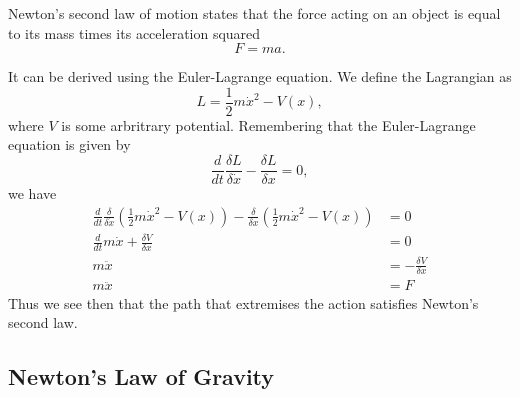 \documentclass{article}
\begin{document}
Newton's second law of motion states that the force acting on an object is equal to its mass times its acceleration squared
\begin{equation}
    F = ma.
\end{equation}

It can be derived using the Euler-Lagrange equation. We define the Lagrangian as
\begin{equation}
    L = \frac{1}{2} m \dot{x}^2 - V(x),
\end{equation}
where $V$ is some arbritrary potential. Remembering that the Euler-Lagrange equation is given by
\begin{equation}
    \frac{d}{dt}\frac{\delta L}{\delta \dot{x}} - \frac{\delta L}{\delta x} = 0,
\end{equation}
we have
\begin{equation}
    \begin{aligned}
    \frac{d}{dt}\frac{\delta }{\delta \dot{x}} (\frac{1}{2} m \dot{x}^2 - V(x)) - \frac{\delta }{\delta x} (\frac{1}{2} m \dot{x}^2 - V(x)) & = 0 \\
    \frac{d}{dt} m\dot{x} + \frac{\delta V}{\delta x} & = 0 \\
    m \ddot{x} & = - \frac{\delta V}{\delta {x}} \\
    m \ddot{x} & = F
    \end{aligned}
\end{equation}
Thus we see then that the path that extremises the action satisfies Newton's second law.

\subsection{Newton's Law of Gravity}
\end{document}
